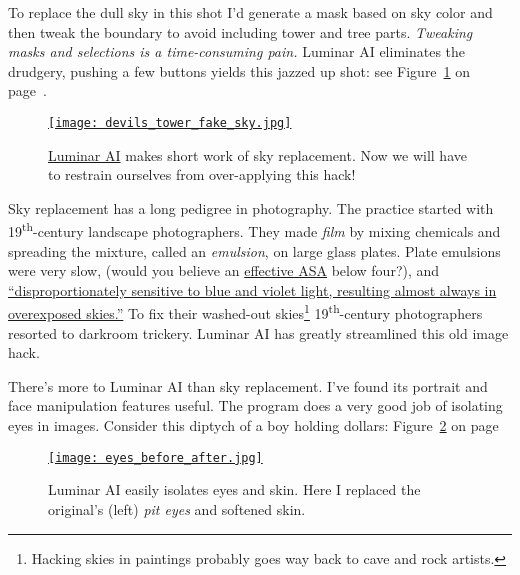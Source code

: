 To replace the dull sky in this shot I'd generate a mask based on sky
color and then tweak the boundary to avoid including tower and tree
parts. \emph{Tweaking masks and selections is a time-consuming pain.}
Luminar AI eliminates the drudgery, pushing a few buttons yields this jazzed up shot: see Figure~\ref{fig:7048X2} on page~\pageref{fig:7048X2}.


\begin{figure}[htbp]
\centering
\href{https://conceptcontrol.smugmug.com/Themes/Manipulations/Fake-Pixels/i-jft2zQ3/A}{\texttt{[image: devils\_tower\_fake\_sky.jpg]}}
\caption[\href{https://skylum.com/luminar-ai-b}{Luminar AI} makes short work of sky replacement]{\href{https://skylum.com/luminar-ai-b}{Luminar AI} makes short work of sky replacement. Now we
will have to restrain ourselves from over-applying this hack!} 
\label{fig:7048X2}
\end{figure}

Sky replacement has a long pedigree in photography. The practice started
with 19\textsuperscript{th}-century landscape photographers. They made
\emph{film} by mixing chemicals and spreading the mixture, called an
\emph{emulsion}, on large glass plates. Plate emulsions were very slow,
(would you believe an
\href{https://en.wikipedia.org/wiki/Film_speed}{effective ASA} below
four?), and
\href{https://www.nytimes.com/2012/10/12/arts/design/faking-it-at-the-met-a-photography-exhibition.html}{``disproportionately
sensitive to blue and violet light, resulting almost always in
overexposed skies.''} To fix their washed-out
skies\footnote{Hacking skies in paintings probably 
goes way back to cave and rock artists.
} 19\textsuperscript{th}-century photographers resorted to darkroom
trickery. Luminar AI has greatly streamlined this old image hack.

There's more to Luminar AI than sky replacement. I've found its portrait
and face manipulation features useful. The program does a very good job
of isolating eyes in images. Consider this diptych of a boy holding
dollars: Figure~\ref{fig:7048X3} on page~\pageref{fig:7048X3}


\begin{figure}[htbp]
\centering
\href{https://bakerjd99.files.wordpress.com/2021/01/eyes_before_after.jpg}{\texttt{[image: eyes\_before\_after.jpg]}}
\caption[Luminar AI easily isolates eyes and skin]{Luminar AI easily isolates eyes and skin. Here I 
replaced the original's (left)  \emph{pit eyes} and softened skin.} 
\label{fig:7048X3}
\end{figure}

